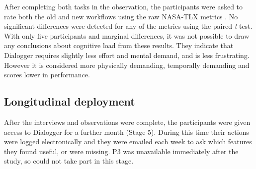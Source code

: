 After completing both tasks in the observation, the participants were asked to
rate both the old and new workflows using the raw NASA-TLX metrics
\citep{Hart1988}.
No significant differences were detected for any of the metrics using the paired \textit{t}-test.
With only five participants and marginal differences, it was not possible to
draw any conclusions about cognitive load from these results.  They indicate
that Dialogger requires slightly less effort and mental demand, and is less
frustrating.
However it is considered more physically demanding, temporally
demanding and scores lower in performance.



\subsection{Longitudinal deployment}

After the interviews and observations were complete, the participants were given access to Dialogger for a further
month (Stage 5). During this time their actions were logged electronically and they were emailed each week to ask which
features they found useful, or were missing. P3 was unavailable immediately after the study, so could not take part in
this stage.

